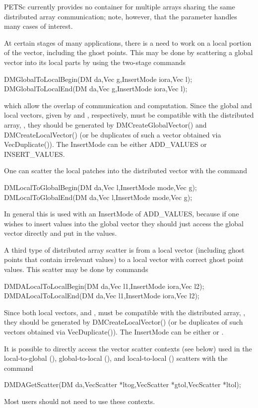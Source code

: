 PETSc currently provides no container for multiple arrays sharing the
same distributed array communication; note, however, that the 
parameter handles many cases of interest.

At certain stages of many applications, there is a need to work
on a local portion of the vector, including the ghost points.
This may be done by scattering a global vector into its
local parts by using the two-stage commands
\begin{tabbing}
  DMGlobalToLocalBegin(DM da,Vec g,InsertMode iora,Vec l);\\
  DMGlobalToLocalEnd(DM da,Vec g,InsertMode iora,Vec l);
\end{tabbing}
which allow the overlap of communication and computation.
Since the global and local vectors, given by  and , respectively,
must be compatible with the distributed array, , they should be
generated by DMCreateGlobalVector()
and DMCreateLocalVector()
(or be duplicates of such a vector obtained via VecDuplicate()).
The InsertMode can be either ADD\_VALUES or INSERT\_VALUES.

One can scatter the local patches into the distributed vector
with the command
\begin{tabbing}
  DMLocalToGlobalBegin(DM da,Vec l,InsertMode mode,Vec g);
  DMLocalToGlobalEnd(DM da,Vec l,InsertMode mode,Vec g);
\end{tabbing}
In general this is used with an InsertMode of  ADD\_VALUES, because if one wishes to insert values into the global vector they should
just access the global vector directly and put in the values.

A third type of distributed array scatter is from a local
vector (including ghost points that contain irrelevant values) to
a local vector with correct ghost point values.
This scatter may be done by
commands
\begin{tabbing}
  DMDALocalToLocalBegin(DM da,Vec l1,InsertMode iora,Vec l2);\\
  DMDALocalToLocalEnd(DM da,Vec l1,InsertMode iora,Vec l2);
\end{tabbing}
Since both local vectors,  and ,
must be compatible with the distributed array, , they should be
generated by DMCreateLocalVector()
(or be duplicates of such vectors obtained via VecDuplicate()).
The InsertMode can be either  or .

It is possible to directly access the vector scatter contexts (see below)
used in the local-to-global (), global-to-local
(), and local-to-local ()
scatters with the command
\begin{tabbing}
  DMDAGetScatter(DM da,VecScatter *ltog,VecScatter *gtol,VecScatter *ltol);
\end{tabbing}
Most users should not need to use these contexts.


